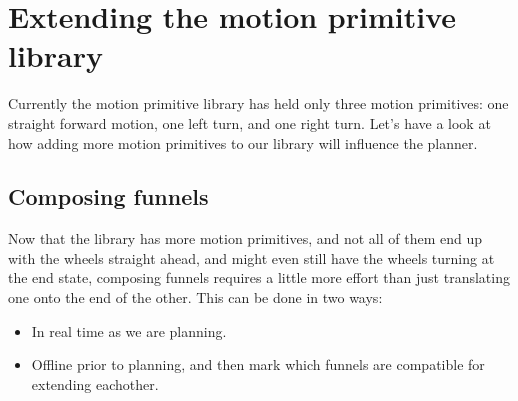
\section{Extending the motion primitive library}

Currently the motion primitive library has held only three motion primitives:
one straight forward motion, one left turn, and one right turn. Let's have a
look at how adding more motion primitives to our library will influence the
planner.

\subsection{Composing funnels}

Now that the library has more motion primitives, and not all of them end up with
the wheels straight ahead, and might even still have the wheels turning at the
end state, composing funnels requires a little more effort than just
translating one onto the end of the other. This can be done in two ways:
\begin{itemize}
  \item In real time as we are planning.
  \item Offline prior to planning, and then mark which funnels are compatible
    for extending eachother.
\end{itemize}